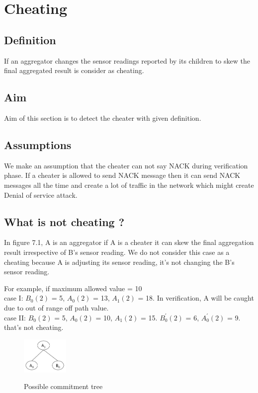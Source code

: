 \chapter{Cheating}

\section{Definition}
If an aggregator changes the sensor readings reported by its children to skew the final aggregated result is consider as cheating.

\section{Aim}
Aim of this section is to detect the cheater with given definition. 

\section{Assumptions}
We make an assumption that the cheater can not say NACK during verification phase. If a cheater is allowed to send NACK message then it can send NACK messages all the time and create a lot of traffic in the network which might create Denial of service attack. 

\section{What is not cheating ?}
	
	In figure 7.1, A is an aggregator if A is a cheater it can skew the final aggregation result irrespective of B's sensor reading. We do not consider this case as a cheating because A is adjusting its sensor reading, it's not changing the B's sensor reading. 
  
	For example, if maximum allowed value = 10\\
  
  case I: $B_{0}(2)$ = 5, $A_{0}(2)$ = 13, $A_{1}(2)$ = 18. In verification, A will be caught due to out of range off path value.\\

  case II: $B_{0}(2)$ = 5, $A_{0}(2)$ = 10, $A_{1}(2)$ = 15. $B_{0}^{'}(2)$ = 6, $A_{0}^{'}(2)$ = 9. that's not cheating.\\ 

	\begin{figure}[t]
		\centering
			\includegraphics[width=0.2\textwidth]{commitment_tree_1.png}\\
			\caption{Possible commitment tree}
	\end{figure}

